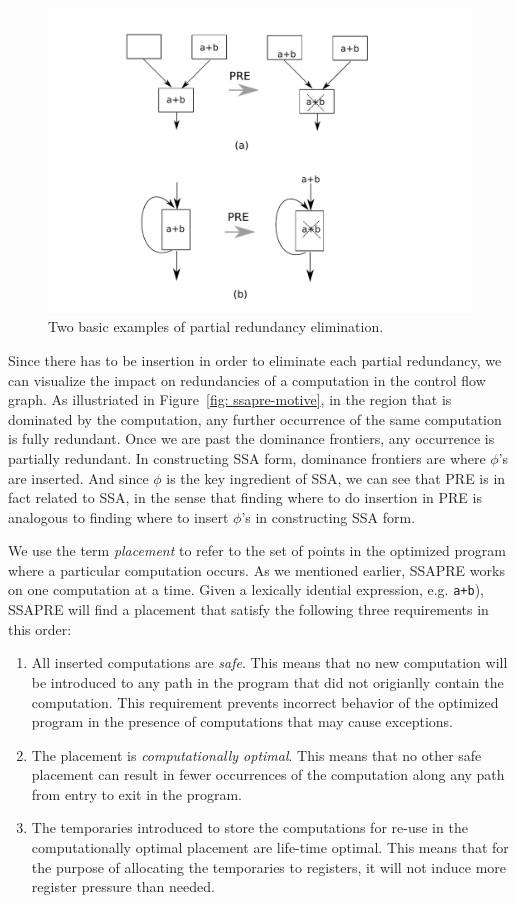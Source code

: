 \begin{figure}
\centering
\includegraphics[scale=0.45]{fig-pre-examples.pdf}
\caption{Two basic examples of partial redundancy elimination.}
\label{fig: pre-examples}
\end{figure}

Since there has to be insertion in order to eliminate each partial
redundancy, we can visualize the impact on redundancies of a computation
in the control flow graph.  As illustriated in
Figure~\ref{fig: ssapre-motive}, in the region that is dominated by the 
computation, any further occurrence of the same computation is fully 
redundant.  Once we are past the dominance frontiers, any occurrence is
partially redundant.  In constructing SSA form, dominance frontiers are where
$\phi$'s are inserted.  And since $\phi$ is the key ingredient of SSA, we
can see that PRE is in fact related to SSA, in the sense that finding where
to do insertion in PRE is analogous to finding where to insert $\phi$'s in
constructing SSA form.

We use the term \emph{placement} to refer to the set of points in the 
optimized program where a particular computation occurs.
As we mentioned earlier, SSAPRE works on one computation at a time.
Given a lexically idential expression, e.g. {\tt a+b}), SSAPRE will find
a placement that satisfy the following three requirements in this order:
\begin{enumerate}
\item All inserted computations are \emph{safe}.  This means that no new 
computation will be introduced to any path in the program that did not 
origianlly contain the computation.  This requirement prevents incorrect 
behavior of the optimized program in the presence of computations that may 
cause exceptions.
\item The placement is \emph{computationally optimal}.  This means that no
other safe placement can result in fewer occurrences of the computation
along any path from entry to exit in the program.
\item The temporaries introduced to store the computations for re-use in the
computationally optimal placement are life-time optimal.  This means that
for the purpose of allocating the temporaries to registers, it will not
induce more register pressure than needed.
\end{enumerate}

